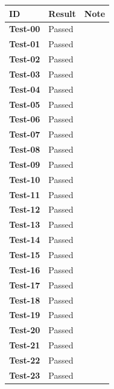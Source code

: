 \documentclass[a4paper]{article}
\begin{document}
\bgroup{}
\def\arraystretch{1.25}
\begin{center}
    \begin{tabular}{ |l|l|l| }
        \hline
        \textbf{ID} & \textbf{Result} & \textbf{Note} \\
        \hline
        \textbf{Test-00} & \color{darkgreen} Passed & \- \\
        \hline
        \textbf{Test-01} & \color{darkgreen} Passed & \- \\
        \hline
        \textbf{Test-02} & \color{darkgreen} Passed & \- \\
        \hline
        \textbf{Test-03} & \color{darkgreen} Passed & \- \\
        \hline
        \textbf{Test-04} & \color{darkgreen} Passed & \- \\
        \hline
        \textbf{Test-05} & \color{darkgreen} Passed & \- \\
        \hline
        \textbf{Test-06} & \color{darkgreen} Passed & \- \\
        \hline
        \textbf{Test-07} & \color{darkgreen} Passed & \- \\
        \hline
        \textbf{Test-08} & \color{darkgreen} Passed & \- \\
        \hline
        \textbf{Test-09} & \color{darkgreen} Passed & \- \\
        \hline
        \textbf{Test-10} & \color{darkgreen} Passed & \- \\
        \hline
        \textbf{Test-11} & \color{darkgreen} Passed & \- \\
        \hline
        \textbf{Test-12} & \color{darkgreen} Passed & \- \\
        \hline
        \textbf{Test-13} & \color{darkgreen} Passed & \- \\
        \hline
        \textbf{Test-14} & \color{darkgreen} Passed & \- \\
        \hline
        \textbf{Test-15} & \color{darkgreen} Passed & \- \\
        \hline
        \textbf{Test-16} & \color{darkgreen} Passed & \- \\
        \hline
        \textbf{Test-17} & \color{darkgreen} Passed & \- \\
        \hline
        \textbf{Test-18} & \color{darkgreen} Passed & \- \\
        \hline
        \textbf{Test-19} & \color{darkgreen} Passed & \- \\
        \hline
        \textbf{Test-20} & \color{darkgreen} Passed & \- \\
        \hline
        \textbf{Test-21} & \color{darkgreen} Passed & \- \\
        \hline
        \textbf{Test-22} & \color{darkgreen} Passed & \- \\
        \hline
        \textbf{Test-23} & \color{darkgreen} Passed & \- \\
        \hline
    \end{tabular}
\end{center}
\egroup{}
\end{document}
